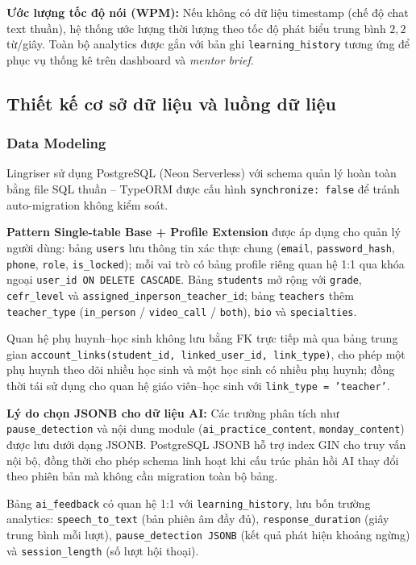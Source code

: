 \textbf{Ước lượng tốc độ nói (WPM):} Nếu không có dữ liệu timestamp (chế độ chat text thuần), hệ thống ước lượng thời lượng theo tốc độ phát biểu trung bình $2{,}2$ từ/giây. Toàn bộ analytics được gắn với bản ghi \texttt{learning\_history} tương ứng để phục vụ thống kê trên dashboard và \textit{mentor brief}.

\subsection{Thiết kế cơ sở dữ liệu và luồng dữ liệu}

\subsubsection{Data Modeling}

Lingriser sử dụng PostgreSQL (Neon Serverless) với schema quản lý hoàn toàn bằng file SQL thuần -- TypeORM được cấu hình \texttt{synchronize: false} để tránh auto-migration không kiểm soát.

\textbf{Pattern Single-table Base + Profile Extension} được áp dụng cho quản lý người dùng: bảng \texttt{users} lưu thông tin xác thực chung (\texttt{email}, \texttt{password\_hash}, \texttt{phone}, \texttt{role}, \texttt{is\_locked}); mỗi vai trò có bảng profile riêng quan hệ 1:1 qua khóa ngoại \texttt{user\_id ON DELETE CASCADE}. Bảng \texttt{students} mở rộng với \texttt{grade}, \texttt{cefr\_level} và \texttt{assigned\_inperson\_teacher\_id}; bảng \texttt{teachers} thêm \texttt{teacher\_type} (\texttt{in\_person} / \texttt{video\_call} / \texttt{both}), \texttt{bio} và \texttt{specialties}.

Quan hệ phụ huynh--học sinh không lưu bằng FK trực tiếp mà qua bảng trung gian \texttt{account\_links(student\_id, linked\_user\_id, link\_type)}, cho phép một phụ huynh theo dõi nhiều học sinh và một học sinh có nhiều phụ huynh; đồng thời tái sử dụng cho quan hệ giáo viên--học sinh với \texttt{link\_type = 'teacher'}.

\textbf{Lý do chọn JSONB cho dữ liệu AI:} Các trường phân tích như \texttt{pause\_detection} và nội dung module (\texttt{ai\_practice\_content}, \texttt{monday\_content}) được lưu dưới dạng JSONB. PostgreSQL JSONB hỗ trợ index GIN cho truy vấn nội bộ, đồng thời cho phép schema linh hoạt khi cấu trúc phản hồi AI thay đổi theo phiên bản mà không cần migration toàn bộ bảng.

Bảng \texttt{ai\_feedback} có quan hệ 1:1 với \texttt{learning\_history}, lưu bốn trường analytics: \texttt{speech\_to\_text} (bản phiên âm đầy đủ), \texttt{response\_duration} (giây trung bình mỗi lượt), \texttt{pause\_detection JSONB} (kết quả phát hiện khoảng ngừng) và \texttt{session\_length} (số lượt hội thoại).

